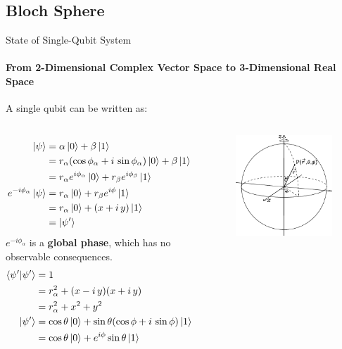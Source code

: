 \documentclass{beamer}
\begin{document}
\subsection{Bloch Sphere}
\begin{frame}{State of Single-Qubit System\tiny\cite{blochsphere}}
  \framesubtitle{From 2-Dimensional Complex Vector Space to 3-Dimensional Real Space}
  {\tiny
  A single qubit can be written as:
  \begin{columns}
  \begin{align*}
    \ket{\psi} &= \alpha\ket{0}+\beta\ket{1} \\
               &= r_{\alpha}(\cos\phi_{\alpha} + i\,\sin\phi_{\alpha})\ket{0}+\beta\ket{1} \\
               &= r_{\alpha}e^{i\phi_{\alpha}}\ket{0} + r_{\beta}e^{i\phi_{\beta}}\ket{1}
    \\
    e^{-i\phi_{\alpha}}\ket{\psi} &= r_{\alpha}\ket{0} + r_{\beta}e^{i\phi}\ket{1} \\
                                  &= r_{\alpha}\ket{0} + (x+i\,y)\ket{1} \\
                                  &= \ket{\psi'}
  \end{align*}
  $e^{-i\phi_{\alpha}}$ is a \textbf{global phase}, which has no observable consequences.
  \begin{align*}
    \braket{\psi'|\psi'} &= 1 \\
                         &= r_{\alpha}^2 + (x-i\,y)(x+i\,y) \\
                         &= r_{\alpha}^2 + x^2 + y^2
    \\
    \ket{\psi'} &= \cos\theta\ket{0} + \sin\theta(\cos\phi + i\,\sin\phi)\ket{1} \\
                &= \cos\theta\ket{0}+e^{i\phi}\sin\theta\ket{1}
  \end{align*}
    \begin{figure}
      \includegraphics[scale=0.155]{figures/The-spherical-polar-coordinate-system}

\end{figure}
\end{columns}}
\end{frame}
\end{document}
